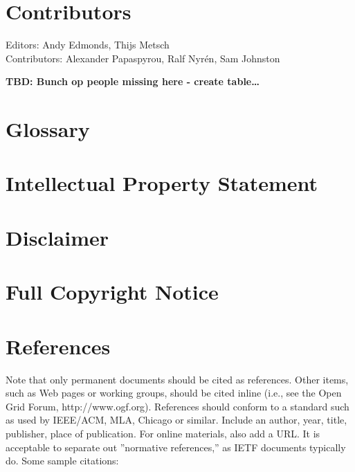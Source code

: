 \documentclass[10pt,a4paper,british]{article}
\begin{document}
\section{Contributors}
Editors: Andy Edmonds, Thijs Metsch \\
Contributors: Alexander Papaspyrou, Ralf Nyrén, Sam Johnston

\textbf{TBD: Bunch op people missing here - create table\ldots}

\section{Glossary}
\label{sec:glossary}



\section{Intellectual Property Statement}


\section{Disclaimer}


\section{Full Copyright Notice}


\section{References}

Note that only permanent documents should be cited as
references. Other items, such as Web pages or working groups, should
be cited inline (i.e., see the Open Grid Forum,
http://www.ogf.org). References should conform to a standard such as
used by IEEE/ACM, MLA, Chicago or similar. Include an author, year,
title, publisher, place of publication. For online materials, also add
a URL. It is acceptable to separate out ''normative references,'' as
IETF documents typically do. Some sample citations:
\end{document}
